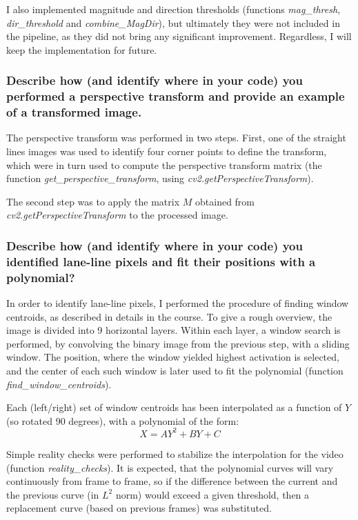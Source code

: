 \documentclass[a4paper,10pt]{article}
\begin{document}
I also implemented magnitude and direction thresholds (functions \emph{mag\_thresh}, \emph{dir\_threshold} and \emph{combine\_MagDir}),
but ultimately they were not included in the pipeline, as they did not bring any significant improvement.
Regardless, I will keep the implementation for future.

\subsubsection{Describe how (and identify where in your code) you performed a perspective transform and provide an example of a transformed image.}

The perspective transform was performed in two steps.
First, one of the straight lines images was used to identify four corner points to define the transform,
which were in turn used to compute the perspective transform matrix
(the function \emph{get\_perspective\_transform}, using \emph{cv2.getPerspectiveTransform}).

The second step was to apply the matrix $M$ obtained from \emph{cv2.getPerspectiveTransform} to the processed image.
\subsubsection{Describe how (and identify where in your code) you identified lane-line pixels and fit their positions with a polynomial?}

In order to identify lane-line pixels, I performed the procedure of finding window centroids, as described in details in the course.
To give a rough overview, the image is divided into 9 horizontal layers. Within each layer, a window search is performed,
by convolving the binary image from the previous step, with a sliding window. 
The position, where the window yielded highest activation is selected,
and the center of each such window is later used to fit the polynomial (function \emph{find\_window\_centroids}).

Each (left/right) set of window centroids has been interpolated as a function of $Y$ (so rotated 90 degrees), with a polynomial of the form:
%
$$
 X = AY^2 + BY + C
$$

Simple reality checks were performed to stabilize the interpolation for the video (function \emph{reality\_checks}).
It is expected, that the polynomial curves will vary continuously from frame to frame,
so if the difference between the current and the previous curve (in $L^2$ norm) would exceed a given threshold,
then a replacement curve (based on previous frames) was substituted.
\end{document}
